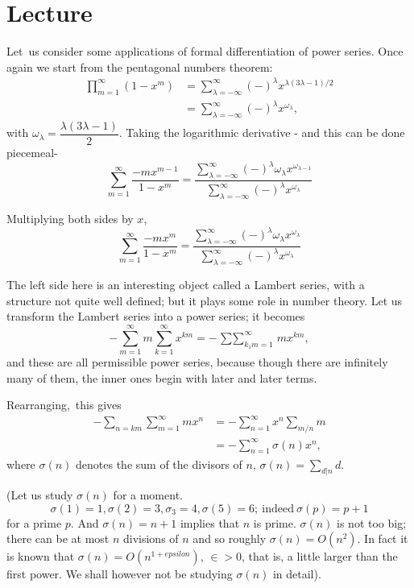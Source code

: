 \chapter{Lecture}\label{part1:lec5}

Let\pageoriginale\  us consider some applications of formal differentiation of power
series. Once again we start from the pentagonal numbers theorem:
\begin{align*}
  \prod^\infty_{m=1} (1-x^m) & = \sum^\infty_{\lambda =- \infty}
  (-)^\lambda x^{\lambda (3 \lambda -1)/2}\\
  & = \sum^\infty_{\lambda=-\infty} (-)^\lambda x^{\omega_\lambda},
  \tag{1}\label{part1:lec5:eq1} 
\end{align*}
with $\omega_\lambda= \dfrac{\lambda(3 \lambda-1)}{2}$. Taking the
logarithmic derivative - and this can be done piecemeal-
$$
\sum^\infty_{m=1} \frac{-mx^{m-1}}{1-x^m} =
\frac{\sum\limits^\infty_{\lambda=-\infty} (-)^\lambda \omega_\lambda
  x^{\omega_{\lambda-1}}}{\sum\limits^\infty_{\lambda=-\infty}
  (-)^\lambda x^{\omega_\lambda}} 
$$

Multiplying both sides by $x$, 
\begin{equation*}
\sum^\infty_{m=1} \frac{-mx^{m}}{1-x^m} =
\frac{\sum\limits^\infty_{\lambda=-\infty} (-)^\lambda \omega_\lambda
  x^{\omega_\lambda}}{\sum\limits^\infty_{\lambda=-\infty}
  (-)^\lambda x^{\omega_\lambda}} \tag{2} \label{part1:lec5:eq2}
\end{equation*}

The left side here is an interesting object called a Lambert series, with a
structure not quite well defined; but it plays some role in number
theory. Let us transform the Lambert series into a power series; it
becomes
$$
- \sum^\infty_{m=1} m \sum^\infty_{k=1} x^{km} = -
\mathop{\sum\sum}^\infty_{k_1 m=1} m x^{km},
$$
and these are all permissible power series, because though there are
infinitely many of them, the inner ones begin with later and later
terms. 

Rearranging,\pageoriginale\  this gives
\begin{align*}
  - \sum_{n=km} \sum^\infty_{m=1} m x^n & = - \sum^\infty_{n=1} x^n
  \sum_{m/n} m\\
  & = - \sum^\infty_{n=1} \sigma (n) x^n,
\end{align*}
where $\sigma(n)$ denotes the sum of the divisors of $n$, $\sigma(n) =
\sum\limits_{d|n} d$.

(Let us study $\sigma (n)$ for a moment.
$$
\sigma(1) =1, \sigma(2)=3, \sigma_3=4, \sigma(5) =6; ~\text{indeed}~
\sigma(p) = p+1
$$  
for a prime $p$. And $\sigma (n) = n+1$ implies that $n$ is
prime. $\sigma(n)$ is not too big; there can be at most $n$ divisions 
of $n$ and so roughly $\sigma(n) =O (n^2)$. In fact it is known that
$\sigma(n) = O (n^{1+epsilon})$, $\in > 0$, that is, a little larger than the
first power. We shall however not be studying $\sigma(n)$ in detail).

